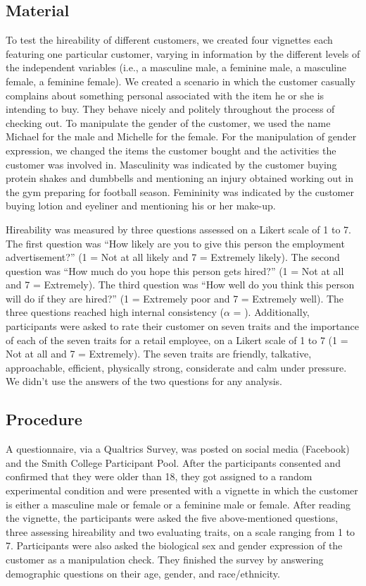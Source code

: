 \documentclass[english,man]{apa6}
\theoremstyle{definition}
\theoremstyle{definition}
\theoremstyle{remark}
\begin{document}
\subsection{Material}\label{material}

To test the hireability of different customers, we created four
vignettes each featuring one particular customer, varying in information
by the different levels of the independent variables (i.e., a masculine
male, a feminine male, a masculine female, a feminine female). We
created a scenario in which the customer casually complains about
something personal associated with the item he or she is intending to
buy. They behave nicely and politely throughout the process of checking
out. To manipulate the gender of the customer, we used the name Michael
for the male and Michelle for the female. For the manipulation of gender
expression, we changed the items the customer bought and the activities
the customer was involved in. Masculinity was indicated by the customer
buying protein shakes and dumbbells and mentioning an injury obtained
working out in the gym preparing for football season. Femininity was
indicated by the customer buying lotion and eyeliner and mentioning his
or her make-up.

Hireability was measured by three questions assessed on a Likert scale
of 1 to 7. The first question was \enquote{How likely are you to give
this person the employment advertisement?} (1 = Not at all likely and 7
= Extremely likely). The second question was \enquote{How much do you
hope this person gets hired?} (1 = Not at all and 7 = Extremely). The
third question was \enquote{How well do you think this person will do if
they are hired?} (1 = Extremely poor and 7 = Extremely well). The three
questions reached high internal consistency (\(\alpha\) = ).
Additionally, participants were asked to rate their customer on seven
traits and the importance of each of the seven traits for a retail
employee, on a Likert scale of 1 to 7 (1 = Not at all and 7 =
Extremely). The seven traits are friendly, talkative, approachable,
efficient, physically strong, considerate and calm under pressure. We
didn't use the answers of the two questions for any analysis.

\subsection{Procedure}\label{procedure}

A questionnaire, via a Qualtrics Survey, was posted on social media
(Facebook) and the Smith College Participant Pool. After the
participants consented and confirmed that they were older than 18, they
got assigned to a random experimental condition and were presented with
a vignette in which the customer is either a masculine male or female or
a feminine male or female. After reading the vignette, the participants
were asked the five above-mentioned questions, three assessing
hireability and two evaluating traits, on a scale ranging from 1 to 7.
Participants were also asked the biological sex and gender expression of
the customer as a manipulation check. They finished the survey by
answering demographic questions on their age, gender, and
race/ethnicity.
\end{document}
